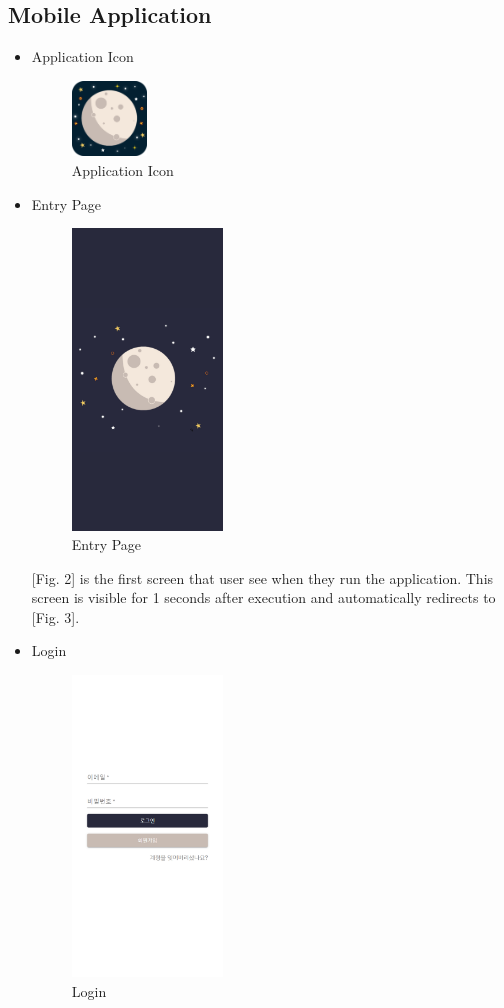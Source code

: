 \documentclass[conference]{IEEEtran}
\begin{document}
\subsection{Mobile Application}
\begin{itemize}
\setlength{\parindent}{2ex}
    \item Application Icon
    \begin{figure}[htbp]
    \includegraphics[width=2cm, height=2cm, center]{icon.png}
    \caption{Application Icon}
    \label{fig1}
    \end{figure}
    
    \item Entry Page
    \begin{figure}[htbp]
    \includegraphics[width=4cm, height=8cm, center]{EntryPage.png}
    \caption{Entry Page}
    \label{fig2}
    \end{figure}
    
    [Fig. 2] is the first screen that user see when they run the application. This screen is visible for 1 seconds after execution and automatically redirects to [Fig. 3].
    \item Login
    
    \begin{figure}[htbp]
    \includegraphics[width=4cm, height=8cm, center]{login.png}
    \caption{Login}
    \label{fig3}
    \end{figure}


\end{itemize}
\end{document}
